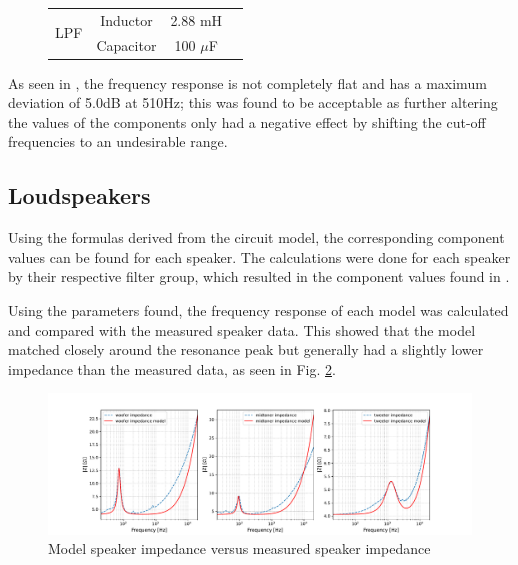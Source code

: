 \begin{figure}[H]
\begin{minipage}{0.50\textwidth}
\begin{tabular}{@{}lccc@{}}
    \multirow{2}{*}{LPF} 
                             & Inductor                & 2.88 mH         \\
                             & Capacitor                 & 100 $\mu$F     \\ \bottomrule
    \end{tabular}
    
        \label{tab:filter_components}
    \end{minipage}
\end{figure}


As seen in , the frequency response is not     completely flat and has a maximum deviation of 5.0dB at 510Hz; this was found to be acceptable as further altering the values of the components only had a negative effect by shifting the cut-off frequencies to an undesirable range.



\subsection{Loudspeakers}
Using the formulas derived from the circuit model, the corresponding component values can be found for each speaker. The calculations were done for each speaker by their respective filter group, which resulted in the component values found in . 

Using the parameters found, the frequency response of each model was calculated and compared with the measured speaker data. This showed that the model matched closely around the resonance peak but generally had a slightly lower impedance than the measured data, as seen in Fig. \ref{fig:/model vs measured impedance}. 

\begin{figure}[H]
    \centering
    \includegraphics[width=1\textwidth]{TU Delft Booming Bass Project Report/figures/FilterGroup/model vs measured impedance.pdf}
    \captionsetup{justification=raggedright, labelfont=bf}
    \caption{Model speaker impedance versus measured speaker impedance}
    \label{fig:/model vs measured impedance}
\end{figure}

